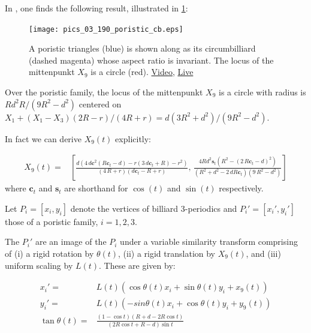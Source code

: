 In \cite[page 17]{odehnal2011-poristic}, one finds the following result, illustrated in \cref{fig:03-poristic-x9}:

\begin{figure}
    \centering
    \texttt{[image: pics\_03\_190\_poristic\_cb.eps]}
    \caption{A poristic triangles (blue) is shown along as its circumbilliard (dashed magenta) whose aspect ratio is invariant. The locus of the mittenpunkt $X_9$ is a circle (red). \href{https://youtu.be/LGgh11LMGGY}{Video}, \href{https://bit.ly/3tcGtOj}{Live}}
    \label{fig:03-poristic-x9}
\end{figure}

\begin{lemma}
Over the poristic family, the locus of the mittenpunkt $X_9$ is a circle with radius is $R{d^2}R/(9R^2-d^2)$ centered on $X_1 + (X_1 - X_3) (2 R - r)/(4 R + r)=d (3 R^2+d^2)/(9R^2-d^2)$. 
\end{lemma}

In fact we can derive $X_9(t)$ explicitly:

\begin{lemma}
{\small
\begin{align}
    X_9(t)= &\left[  \frac {d \left( 4\, d \mathbf{c}^2   
 \left( R\mathbf{c}_t-d \right) -r \left( 3\,d\mathbf{c}_t  +R \right) -{r}^{2} \right) }{ \left( 4\,R+r \right) 
 \left(d \mathbf{c}_t  -R+r \right) }
  , \, \frac {4R{d}^{2}\mathbf{s}_t  \left( R^2- \left( 2\,R\mathbf{c}_t-d \right) ^{2}  \right) }{ \left( {R}^{2}+{d
}^{2}-2\,dR\mathbf{c}_t  \right)  \left( 9\,{R}^{2}-{d}^{2}
 \right) }
    \right]
\label{eq:03-x9-poristic}
\end{align}
where $\mathbf{c}_t$ and $\mathbf{s}_t$ are shorthand for $\cos(t)$ and $\sin(t)$ respectively.
}
\end{lemma}

Let $P_i=[x_i,y_i]$ denote the vertices of billiard 3-periodics and $P_i'=[x_i',y_i']$ those of a poristic family, $i=1,2,3$.

\begin{theorem}
The $P_i'$ are an image of the $P_i$ under a variable similarity transform comprising of (i) a rigid rotation by $\theta(t)$, (ii) a rigid translation by $X_9(t)$, and (iii)  uniform scaling by $L(t)$. These are given by: 

\begin{align*}
    x_i'=&L(t)(\cos \theta(t) x_i+\sin\theta(t) y_i+x_9(t) )\\
    y_i'=&L(t)(-sin\theta(t) x_i+\cos\theta(t) y_i+y_9(t))\\
    \tan\theta(t)=& \frac{(1-\cos t)(R+d-2R\cos t)}{(2R\cos t+R-d)\sin t}
\end{align*}
\label{thm:similarity}
\end{theorem}


